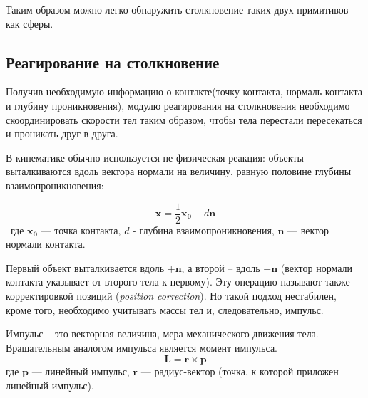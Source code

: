 Таким образом можно легко обнаружить столкновение таких двух примитивов как сферы.
\subsection{Реагирование на столкновение}
Получив необходимую информацию о контакте(точку контакта, нормаль контакта и глубину проникновения), модулю реагирования
на столкновения необходимо скоординировать скорости тел таким образом, чтобы тела перестали пересекаться и проникать друг в друга.  

В кинематике обычно используется не физическая реакция: объекты выталкиваются вдоль вектора нормали на величину,
равную половине глубины взаимопроникновения:

\begin{equation}
\mathbf{x} = \frac{1}{2}\mathbf{x_0} + d\mathbf{n}
\end{equation}
\
где $\mathbf{x_0}$ --- точка контакта, $d$ - глубина взаимопроникновения, $\mathbf{n}$ --- вектор нормали контакта.

Первый объект выталкивается вдоль $+\mathbf{n}$, а второй – вдоль $-\mathbf{n}$ (вектор нормали контакта указывает от второго тела к первому).
Эту операцию называют также корректировкой позиций (\textit{position correction}). Но такой подход нестабилен, кроме того,
необходимо учитывать массы тел и, следовательно, импульс.

Импульс – это векторная величина, мера механического движения тела. Вращательным аналогом импульса является момент импульса.
\begin{equation}
\mathbf{L} = \mathbf{r}\times\mathbf{p}
\end{equation}
где $\mathbf{p}$ --- линейный импульс, $\mathbf{r}$ --- радиус-вектор (точка, к которой приложен линейный импульс).


